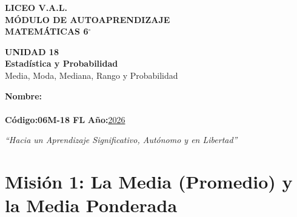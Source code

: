 \documentclass[12pt, letterpaper]{article}
\begin{document}
	
	\begin{center}
		{\Huge\textbf{LICEO V.A.L.}}\\[0.5cm]
		{\LARGE\textbf{MÓDULO DE AUTOAPRENDIZAJE}}\\[0.5cm]
		{\Large\textbf{MATEMÁTICAS 6$^\circ$}}\\[0.5cm]
		\begin{tcolorbox}[colback=valblue!10, colframe=valblue, arc=3mm, boxrule=1.5pt]
			\centering
			\Huge\textbf{UNIDAD 18}\\[0.2cm]
			\Large\textbf{Estadística y Probabilidad}\\[0.2cm]
			\large Media, Moda, Mediana, Rango y Probabilidad
		\end{tcolorbox}
		\vspace{0.6cm}
		\begin{tcolorbox}[colback=white, colframe=valblue, width=12cm, arc=3mm, boxrule=1.5pt]
			\centering\vspace{0.3cm}
			\textbf{Nombre:}\\[0.3cm]
			\underline{\hspace{9cm}}\\[0.5cm]
			\textbf{Código:}\;\textbf{06M-18 FL}
			\hspace{1cm}\textbf{Año:}\;\underline{2026}
			\vspace{0.3cm}
		\end{tcolorbox}
		\vspace{0.8cm}
		\textit{``Hacia un Aprendizaje Significativo, Autónomo y en Libertad''}
	\end{center}
	
	\section*{Misión 1: La Media (Promedio) y la Media Ponderada}
	
\end{document}

